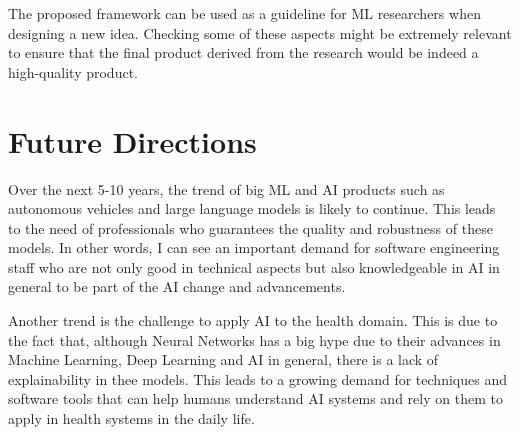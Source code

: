 \documentclass{article}
\begin{document}
The proposed framework can be used as a guideline for ML researchers when designing a new idea. Checking some of these aspects might be extremely relevant to ensure that the final product derived from the research would be indeed a high-quality product.


\section{Future Directions}

Over the next 5-10 years, the trend of big ML and AI products such as autonomous vehicles and large language models is likely to continue. This leads to the need of professionals who guarantees the quality and robustness of these models. In other words, I can see an important demand for software engineering staff who are not only good in technical aspects but also knowledgeable in AI in general to be part of the AI change and advancements.

Another trend is the challenge to apply AI to the health domain. This is due to the fact that, although Neural Networks has a big hype due to their advances in Machine Learning, Deep Learning and AI in general, there is a lack of explainability in thee models. This leads to a growing demand for techniques and software tools that can help humans understand AI systems and rely on them to apply in health systems in the daily life. 



\end{document}
